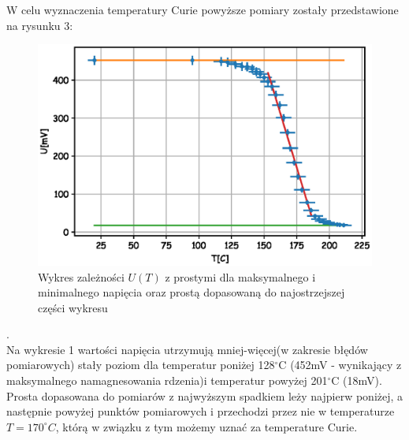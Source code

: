 \documentclass[a4paper,10pt]{article}
\begin{document}
W celu wyznaczenia temperatury Curie powyższe pomiary zostały przedstawione na rysunku 3:
\begin{figure}[H]
  \includegraphics{./Curie_proste.eps}
  \caption{Wykres zależności $U(T)$ z prostymi dla maksymalnego i minimalnego napięcia oraz prostą dopasowaną do najostrzejszej części wykresu}
\end{figure}.
\\Na wykresie 1 wartości napięcia utrzymują mniej-więcej(w zakresie błędów pomiarowych) stały poziom dla temperatur poniżej 128$^\circ$C (452mV -
wynikający z maksymalnego namagnesowania rdzenia)i temperatur powyżej 201$^\circ$C (18mV). Prosta dopasowana do pomiarów z najwyższym spadkiem leży najpierw
poniżej, a następnie powyżej punktów pomiarowych i przechodzi przez nie w temperaturze $T = 170^\circ C$, którą w związku z tym możemy uznać za temperature Curie.
\end{document}
